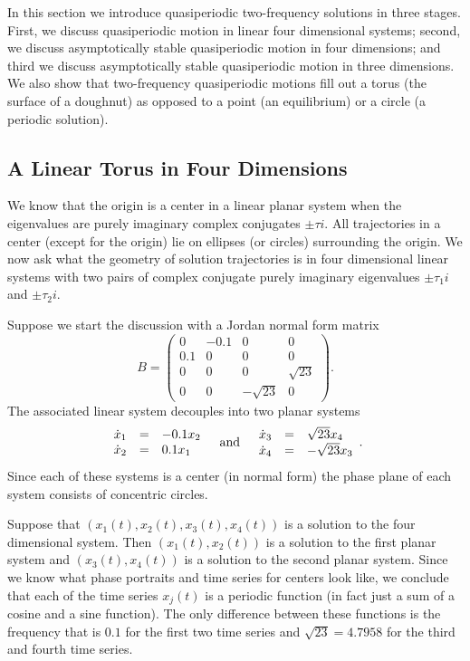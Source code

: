 In this section we introduce quasiperiodic two-frequency solutions in three 
stages.  First, we discuss quasiperiodic motion 
in linear four dimensional systems; second, we discuss asymptotically stable 
quasiperiodic motion in four dimensions; and third we discuss asymptotically
stable quasiperiodic motion in three dimensions.  We also show that
two-frequency quasiperiodic motions fill out a torus (the surface of a
doughnut) as opposed to a point (an equilibrium) or a circle (a periodic 
solution).

\subsection*{A Linear Torus in Four Dimensions}

We know that the origin is a center in a linear planar system 
when the eigenvalues are purely imaginary complex conjugates $\pm\tau i$.
All trajectories in a center (except for the origin) lie on ellipses
(or circles) surrounding the origin. We now ask what the geometry 
of solution trajectories is in four dimensional linear systems with 
two pairs of complex conjugate purely imaginary eigenvalues $\pm\tau_1i$
and $\pm\tau_2i$. 

Suppose we start the discussion with a Jordan normal form 
matrix 
\[
B = \left(\begin{array}{rrrr}
  0  &  -0.1  &  0   &  0       \\
0.1  &    0   &  0   &  0       \\
  0  &    0   &  0   & \sqrt{23}\\
  0  &    0   & -\sqrt{23} & 0
\end{array}\right).
\]
The associated linear system decouples into two planar systems
\[
\begin{array}{rcl}
\dot{x}_1 & = & -0.1x_2 \\
\dot{x}_2 & = &  0.1x_1 \\
\end{array}
\quad\mbox{and}\quad
\begin{array}{rcl}
\dot{x}_3 & = &  \sqrt{23}x_4 \\
\dot{x}_4 & = & -\sqrt{23}x_3 \\
\end{array}.
\]
Since each of these systems is a center (in normal form) the phase 
plane of each system consists of concentric circles.  

Suppose that $(x_1(t),x_2(t),x_3(t),x_4(t))$ is a solution to the 
four dimensional system.  Then $(x_1(t),x_2(t))$ is a solution to the 
first planar system and $(x_3(t),x_4(t))$ is a solution to the second 
planar system.  Since we know what phase portraits
 and time series for
centers look like, we conclude that each of the time series $x_j(t)$ is
a periodic function (in fact just a sum of a cosine and a sine function).  
The only difference between these functions is the frequency that is 
$0.1$ for the first two time series and $\sqrt{23}=4.7958$ for the third 
and fourth time series.


